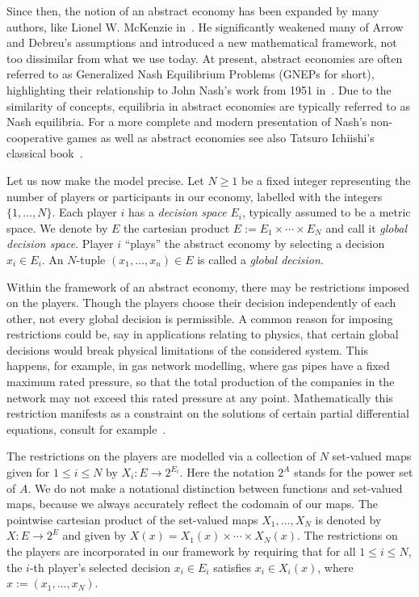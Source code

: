 \documentclass[a4paper,11pt,reqno,english]{amsart}
\theoremstyle{definition}
\begin{document}
Since then, the notion of an abstract economy has been expanded by many authors, like Lionel W. McKenzie in~\cite{McKenzie}.
He significantly weakened many of Arrow and Debreu's assumptions and introduced a new mathematical framework, not too dissimilar from what we use today.
At present, abstract economies are often referred to as Generalized Nash Equilibrium Problems (GNEPs for short), highlighting their relationship to John Nash's work from 1951 in~\cite{Nash1951}.
Due to the similarity of concepts, equilibria in abstract economies are typically referred to as Nash equilibria.
For a more complete and modern presentation of Nash's non-cooperative games as well as abstract economies see also Tatsuro Ichiishi's classical book~\cite{Ichiishi_1983}.

\medskip Let us now make the model precise.
Let $N\geq 1$ be a fixed integer representing the number of players or participants in our economy, labelled with the integers $\{1,\dots,N\}$.
Each player $i$ has a \textit{decision space} $E_i$, typically assumed to be a metric space.
We denote by $E$ the cartesian product $E:= E_1\times\cdots\times E_N$ and call it \textit{global decision space}.
Player $i$ ``plays'' the abstract economy by selecting a decision $x_i\in E_i$.
An $N$-tuple $(x_1,\dots,x_n)\in E$ is called a \textit{global decision}.

Within the framework of an abstract economy, there may be restrictions imposed on the players.
Though the players choose their decision independently of each other, not every global decision is permissible.
A common reason for imposing restrictions could be, say in applications relating to physics, that certain global decisions would break physical limitations of the considered system.
This happens, for example, in gas network modelling, where gas pipes have a fixed maximum rated pressure, so that the total production of the companies in the network may not exceed this rated pressure at any point.
Mathematically this restriction manifests as a constraint on the solutions of certain partial differential equations, consult for example~\cite{Hintermueller2015}.

The restrictions on the players are modelled via a collection of $N$ set-valued maps given for $1\leq i \leq N$ by $X_i\colon E\longrightarrow 2^{E_i}$.
Here the notation $2^A$ stands for the power set of $A$.
We do not make a notational distinction between functions and set-valued maps, because we always accurately reflect the codomain of our maps.
The pointwise cartesian product of the set-valued maps $X_1,\dots,X_N$ is denoted by $X\colon E\longrightarrow 2^E$ and given by $X(x)=X_1(x)\times\cdots\times X_N(x)$.
The restrictions on the players are incorporated in our framework by requiring that for all $1\leq i\leq N$, the $i$-th player's selected decision $x_i\in E_i$ satisfies $x_i\in X_i(x)$, where $x:=(x_1,\dots,x_N)$.
\end{document}
